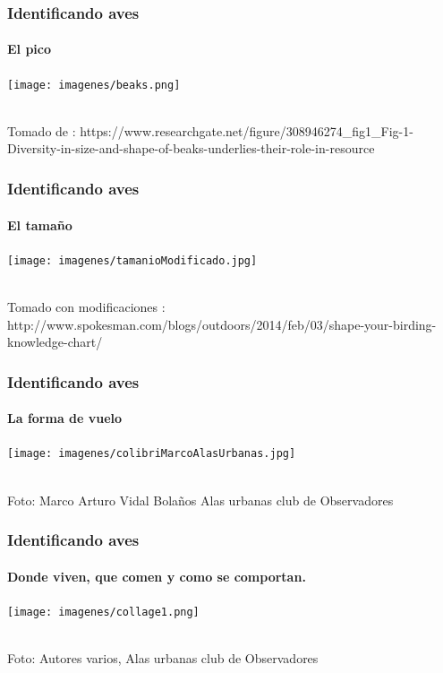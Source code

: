 \documentclass[compress]{beamer}
\begin{document}
{
  \begin{frame}
    \frametitle{Identificando aves}
    \framesubtitle{El pico}
    \begin{center}
      \texttt{[image: imagenes/beaks.png]}\\
      \captionof{}{}
    \end{center}\\[-0.2cm]

   \tiny{Tomado de : https://www.researchgate.net/figure/308946274_fig1_Fig-1-Diversity-in-size-and-shape-of-beaks-underlies-their-role-in-resource}
 \end{frame}
}

{
  \begin{frame}
    \frametitle{Identificando aves}
    \framesubtitle{El tamaño}
    \begin{center}
      \texttt{[image: imagenes/tamanioModificado.jpg]}\\
      \captionof{}{}
    \end{center}\\[-0.2cm]

   \tiny{Tomado con modificaciones : http://www.spokesman.com/blogs/outdoors/2014/feb/03/shape-your-birding-knowledge-chart/}
   \end{frame}
}

{
  \begin{frame}
    \frametitle{Identificando aves}
    \framesubtitle{La forma de vuelo}
    \begin{center}
      \texttt{[image: imagenes/colibriMarcoAlasUrbanas.jpg]}\\
      \captionof{}{}
    \end{center}\\[-0.2cm]

   \tiny{Foto: Marco Arturo Vidal Bolaños Alas urbanas club de Observadores }
   \end{frame}
}

{
  \begin{frame}
    \frametitle{Identificando aves}
    \framesubtitle{Donde viven, que comen y como se comportan.}
    \begin{center}
      \texttt{[image: imagenes/collage1.png]}\\
      \captionof{}{}
    \end{center}\\[-0.2cm]

   \tiny{Foto: Autores varios, Alas urbanas club de Observadores }
   \end{frame}
}
\end{document}
